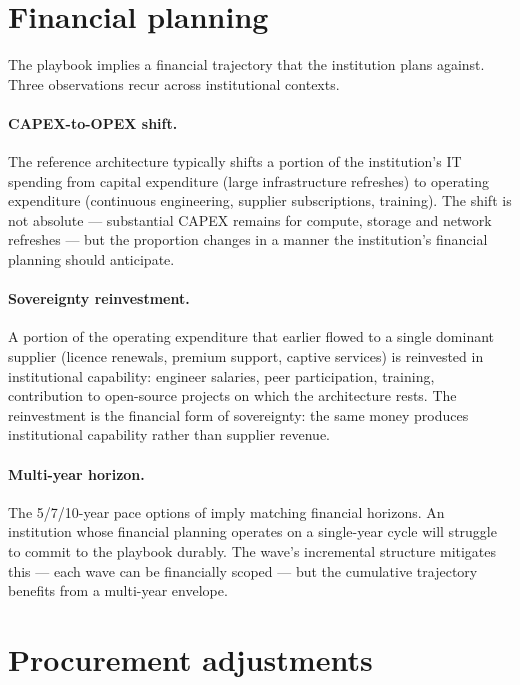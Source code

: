 \section{Financial planning}
\label{sec:cc-financial}

The playbook implies a financial trajectory that the institution
plans against. Three observations recur across institutional
contexts.

\paragraph{CAPEX-to-OPEX shift.} The reference architecture
typically shifts a portion of the institution's IT spending from
capital expenditure (large infrastructure refreshes) to operating
expenditure (continuous engineering, supplier subscriptions,
training). The shift is not absolute --- substantial CAPEX
remains for compute, storage and network refreshes --- but the
proportion changes in a manner the institution's financial
planning should anticipate.

\paragraph{Sovereignty reinvestment.} A portion of the operating
expenditure that earlier flowed to a single dominant supplier
(licence renewals, premium support, captive services) is
reinvested in institutional capability: engineer salaries, peer
participation, training, contribution to open-source projects on
which the architecture rests. The reinvestment is the financial
form of sovereignty: the same money produces institutional
capability rather than supplier revenue.

\paragraph{Multi-year horizon.} The 5/7/10-year pace options of
 imply matching financial
horizons. An institution whose financial planning operates on a
single-year cycle will struggle to commit to the playbook
durably. The wave's incremental structure mitigates this --- each
wave can be financially scoped --- but the cumulative trajectory
benefits from a multi-year envelope.

\section{Procurement adjustments}
\label{sec:cc-procurement}

